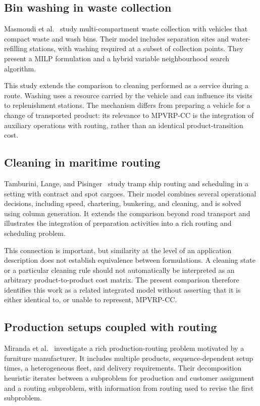 \subsection{Bin washing in waste collection}

Masmoudi et al.~\cite{masmoudi2024multi} study multi-compartment waste
collection with vehicles that compact waste and wash bins. Their model
includes separation sites and water-refilling stations, with washing required
at a subset of collection points. They present a MILP formulation and a
hybrid variable neighbourhood search algorithm.

This study extends the comparison to cleaning performed as a service during
a route. Washing uses a resource carried by the vehicle and can influence
its visits to replenishment stations. The mechanism differs from preparing
a vehicle for a change of transported product: its relevance to MPVRP-CC is
the integration of auxiliary operations with routing, rather than an
identical product-transition cost.

\subsection{Cleaning in maritime routing}

Tamburini, Lange, and Pisinger~\cite{TAMBURINI2025104019} study tramp ship
routing and scheduling in a setting with contract and spot cargoes. Their
model combines several operational decisions, including speed, chartering,
bunkering, and cleaning, and is solved using column generation. It extends
the comparison beyond road transport and illustrates the integration of
preparation activities into a rich routing and scheduling problem.

This connection is important, but similarity at the level of an application
description does not establish equivalence between formulations. A cleaning
state or a particular cleaning rule should not automatically be interpreted
as an arbitrary product-to-product cost matrix. The present comparison
therefore identifies this work as a related integrated model without
asserting that it is either identical to, or unable to represent, MPVRP-CC.

\subsection{Production setups coupled with routing}

Miranda et al.~\cite{MIRANDA2018211} investigate a rich production-routing
problem motivated by a furniture manufacturer. It includes multiple
products, sequence-dependent setup times, a heterogeneous fleet, and delivery
requirements. Their decomposition heuristic iterates between a subproblem
for production and customer assignment and a routing subproblem, with
information from routing used to revise the first subproblem.


